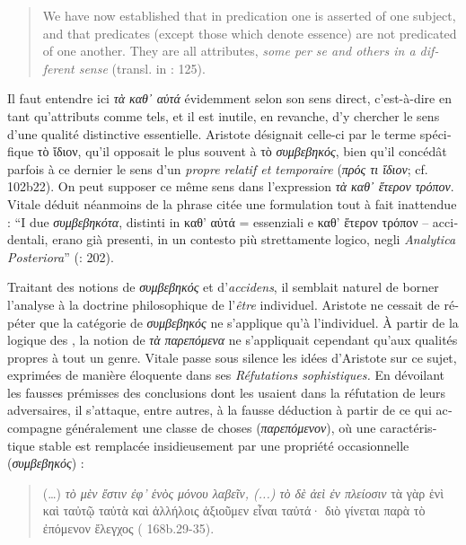 \documentclass[output=paper]{langsci/langscibook}
\begin{document}
\begin{otherlanguage}{french}
\begin{quote}
    We have now established that in predication one is asserted of one subject, and that predicates (except those which denote essence) are not predicated of one another. They are all attributes, \textit{some per se and others in a different sense} (transl. in : 125).
\end{quote}

Il faut entendre ici \textit{τὰ καθ᾿ αὑτά} évidemment selon son sens direct, c’est-à-dire en tant qu’attributs comme tels, et il est inutile, en revanche, d’y chercher le sens d’une qualité distinctive essentielle. Aristote désignait celle-ci par le terme spécifique τὸ ἴδιον, qu’il opposait le plus souvent à τὸ \textit{συμβεβηκός}, bien qu’il concédât parfois à ce dernier le sens d’un \textit{propre relatif et temporaire} (\textit{πρός τι ἴδιον}; cf.  102b22). On peut supposer ce même sens dans l’expression \textit{τὰ καθ᾿ ἕτερον τρόπον}. Vitale déduit néanmoins de la phrase citée une formulation tout à fait inattendue : “I due \textit{συμβεβηκότα}, distinti in καθ’ αὑτά  = essenziali e καθ’ ἕτερον τρόπον – accidentali, erano già presenti, in un contesto più strettamente logico, negli \textit{Analytica Posteriora}” (\citealt{vitale_per_1982}: 202).

Traitant des notions de \textit{συμβεβηκός} et d’\textit{accidens}, il semblait naturel de borner l’analyse à la doctrine philosophique de l’\textit{être} individuel. Aristote ne cessait de répéter que la catégorie de \textit{συμβεβηκός} ne s’applique qu’à l’individuel. À partir de la logique des , la notion de \textit{τὰ} \textit{παρεπόμενα} ne s’appliquait cependant qu’aux qualités propres à tout un genre. Vitale passe sous silence les idées d’Aristote sur ce sujet, exprimées de manière éloquente dans ses \textit{Réfutations sophistiques.} En dévoilant les fausses prémisses des conclusions dont les  usaient dans la réfutation de leurs adversaires, il s’attaque, entre autres, à la fausse déduction à partir de ce qui accompagne généralement une classe de choses (\textit{παρεπόμενον}), où une caractéristique stable est remplacée insidieusement par une propriété occasionnelle (\textit{συμβεβηκός}) :

\begin{quote}
    
(…) \textit{τὸ μὲν  ἔστιν ἐφ’ ἑνὸς μόνου λαβεῖν, (...) τὸ δὲ  ἀεὶ ἐν πλείοσιν} τὰ γὰρ ἑνὶ καὶ ταὐτῷ ταὐτὰ καὶ ἀλλήλοις ἀξιοῦμεν εἶναι ταὐτά· διὸ γίνεται παρὰ τὸ ἐπόμενον ἔλεγχος ( 168b.29-35).


\end{quote}
\end{otherlanguage}
\end{document}
